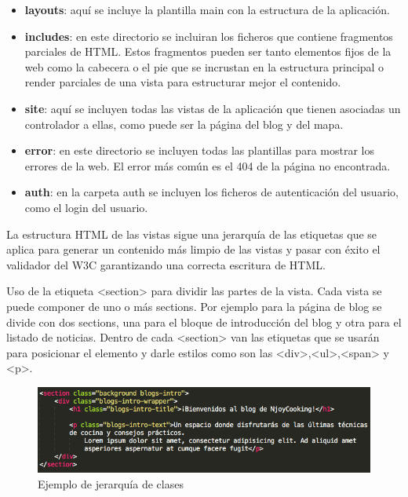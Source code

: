 \begin{itemize}

\item \textbf{layouts}: aquí se incluye la plantilla main con la estructura de la aplicación.

\item \textbf{includes}: en este directorio se incluiran los ficheros que contiene fragmentos parciales de HTML. Estos fragmentos pueden ser tanto elementos fijos de la web como la cabecera o el pie que se incrustan en la estructura principal o render parciales de una vista para estructurar mejor el contenido.

\item \textbf{site}: aquí se incluyen todas las vistas de la aplicación que tienen asociadas un controlador a ellas, como puede ser la página del blog y del mapa.

\item \textbf{error}: en este directorio se incluyen todas las plantillas para mostrar los errores de la web. El error más común es el 404 de la página no encontrada.

\item \textbf{auth}: en la carpeta auth se incluyen los ficheros de autenticación del usuario, como el login del usuario.

\end{itemize}

La estructura HTML de las vistas sigue una jerarquía de las etiquetas que se aplica para generar un contenido más limpio de las vistas y pasar con éxito el validador del W3C garantizando una correcta escritura de HTML.

\vspace{5 mm}


Uso de la etiqueta <section> para dividir las partes de la vista. Cada vista se puede componer de uno o más sections. Por ejemplo para la página de blog se divide con dos sections, una para el bloque de introducción del blog y otra para el listado de noticias. Dentro de cada <section> van las etiquetas que se usarán para posicionar el elemento y darle estilos como son las <div>,<ul>,<span> y <p>.

\vspace{5 mm}

\begin{figure}
\begin{center}
\includegraphics[width=1.0\textwidth]{imagenes/jerarquia-clases.png}
\caption{Ejemplo de jerarquía de clases}
\label{clases-html}
\end{center}
\end{figure}

